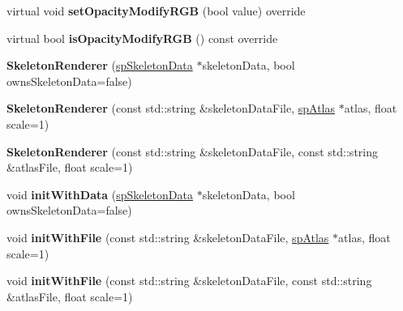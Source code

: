 \begin{DoxyCompactItemize}
\item 
\mbox{\label{classspine_1_1SkeletonRenderer_a794b3cdb87b9e8c867808cb50db5cedd}} 
virtual void {\bfseries set\+Opacity\+Modify\+R\+GB} (bool value) override
\item 
\mbox{\label{classspine_1_1SkeletonRenderer_aa05efa0f25d170a5ba53f061cc606cca}} 
virtual bool {\bfseries is\+Opacity\+Modify\+R\+GB} () const override
\item 
\mbox{\label{classspine_1_1SkeletonRenderer_afbdbe972afcf555a49c850ee9c1274a1}} 
{\bfseries Skeleton\+Renderer} (\hyperlink{structspSkeletonData}{sp\+Skeleton\+Data} $\ast$skeleton\+Data, bool owns\+Skeleton\+Data=false)
\item 
\mbox{\label{classspine_1_1SkeletonRenderer_a1b0fc5fd436836d7d56e330f753e1b85}} 
{\bfseries Skeleton\+Renderer} (const std\+::string \&skeleton\+Data\+File, \hyperlink{structspAtlas}{sp\+Atlas} $\ast$atlas, float scale=1)
\item 
\mbox{\label{classspine_1_1SkeletonRenderer_a428be0adca6889f3dec2d4c0f04d12cf}} 
{\bfseries Skeleton\+Renderer} (const std\+::string \&skeleton\+Data\+File, const std\+::string \&atlas\+File, float scale=1)
\item 
\mbox{\label{classspine_1_1SkeletonRenderer_a49c9e9dc79bdc5b3a6dd2dc26469476f}} 
void {\bfseries init\+With\+Data} (\hyperlink{structspSkeletonData}{sp\+Skeleton\+Data} $\ast$skeleton\+Data, bool owns\+Skeleton\+Data=false)
\item 
\mbox{\label{classspine_1_1SkeletonRenderer_a73e7508fc44554ab8c0df77d1d6d13f2}} 
void {\bfseries init\+With\+File} (const std\+::string \&skeleton\+Data\+File, \hyperlink{structspAtlas}{sp\+Atlas} $\ast$atlas, float scale=1)
\item 
\mbox{\label{classspine_1_1SkeletonRenderer_a2af44630780c45bcafb6a2c64dbcd84f}} 
void {\bfseries init\+With\+File} (const std\+::string \&skeleton\+Data\+File, const std\+::string \&atlas\+File, float scale=1)

\end{DoxyCompactItemize}
